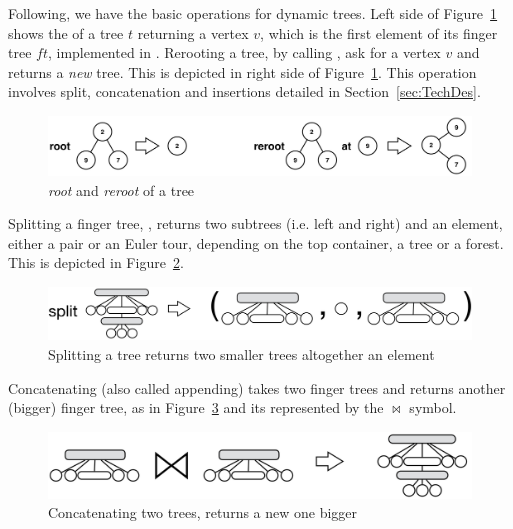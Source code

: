 \documentclass{elsarticle}
\newcommand{\code}[1]{\haskell{#1}}
\begin{document}
Following, we have the basic operations for dynamic trees. Left side of Figure~\ref{fig:rootReroot} shows the \code{root} of a tree $t$ returning a vertex $v$, which is the first element of its finger tree $ft$, implemented in \code{viewl}. Rerooting a tree, by calling \code{reroot}, ask for a vertex $v$ and returns a \textit{new} tree. This is depicted in right side of Figure~\ref{fig:rootReroot}. This operation involves split, concatenation and insertions detailed in Section~\ref{sec:TechDes}.
\begin{figure}
\begin{center}
\includegraphics[scale=0.3]{./Images/rootReroot} 
\end{center}
\caption{\textit{root} and \textit{reroot} of a tree}
\label{fig:rootReroot}
\end{figure}

Splitting a finger tree, \code{split}, returns two subtrees (i.e. left and right) and an element, either a pair or an Euler tour, depending on the top container, a tree or a forest. This is depicted in Figure~\ref{fig:split}.
\begin{figure}
\begin{center}
\includegraphics[scale=0.25]{./Images/split} 
\end{center}
\caption{Splitting a tree returns two smaller trees altogether an element}
\label{fig:split}
\end{figure}

Concatenating (also called appending) takes two finger trees and returns another (bigger) finger tree, as in Figure~\ref{fig:concatenation} and its represented by the $\bowtie$ symbol.
\begin{figure}
\begin{center}
\includegraphics[scale=0.25]{./Images/concatenation} 
\end{center}
\caption{Concatenating two trees, returns a new one bigger}
\label{fig:concatenation}
\end{figure}
\end{document}
